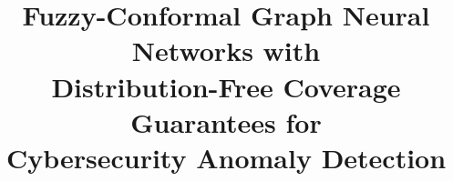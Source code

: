 \documentclass[sn-basic]{sn-jnl}
\theoremstyle{plain}
\theoremstyle{remark}
\begin{document}
\title[Fuzzy-Conformal Graph Neural Networks]{Fuzzy-Conformal Graph Neural Networks with\\
       Distribution-Free Coverage Guarantees for\\
       Cybersecurity Anomaly Detection}

\author*[1]{ }




\maketitle









\end{document}
